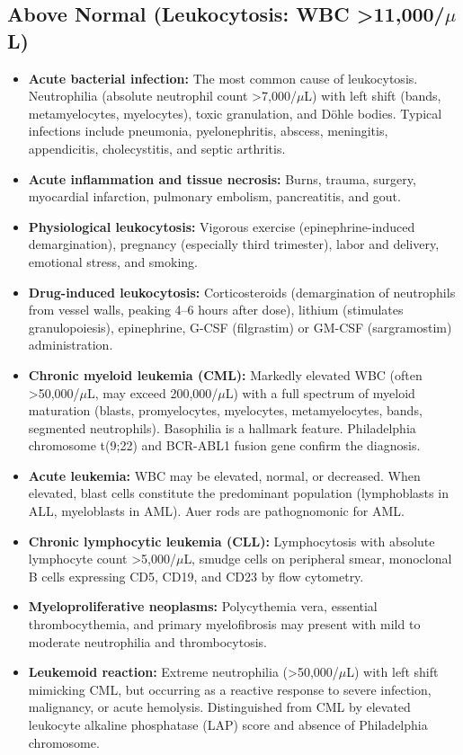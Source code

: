 \subsection*{Above Normal (Leukocytosis: WBC >11,000/$\mu$L)}
\begin{itemize}
  \item \textbf{Acute bacterial infection:} The most common cause of leukocytosis. Neutrophilia (absolute neutrophil count >7,000/$\mu$L) with left shift (bands, metamyelocytes, myelocytes), toxic granulation, and D\"{o}hle bodies. Typical infections include pneumonia, pyelonephritis, abscess, meningitis, appendicitis, cholecystitis, and septic arthritis.
  \item \textbf{Acute inflammation and tissue necrosis:} Burns, trauma, surgery, myocardial infarction, pulmonary embolism, pancreatitis, and gout.
  \item \textbf{Physiological leukocytosis:} Vigorous exercise (epinephrine-induced demargination), pregnancy (especially third trimester), labor and delivery, emotional stress, and smoking.
  \item \textbf{Drug-induced leukocytosis:} Corticosteroids (demargination of neutrophils from vessel walls, peaking 4--6 hours after dose), lithium (stimulates granulopoiesis), epinephrine, G-CSF (filgrastim) or GM-CSF (sargramostim) administration.
  \item \textbf{Chronic myeloid leukemia (CML):} Markedly elevated WBC (often >50,000/$\mu$L, may exceed 200,000/$\mu$L) with a full spectrum of myeloid maturation (blasts, promyelocytes, myelocytes, metamyelocytes, bands, segmented neutrophils). Basophilia is a hallmark feature. Philadelphia chromosome t(9;22) and BCR-ABL1 fusion gene confirm the diagnosis.
  \item \textbf{Acute leukemia:} WBC may be elevated, normal, or decreased. When elevated, blast cells constitute the predominant population (lymphoblasts in ALL, myeloblasts in AML). Auer rods are pathognomonic for AML.
  \item \textbf{Chronic lymphocytic leukemia (CLL):} Lymphocytosis with absolute lymphocyte count >5,000/$\mu$L, smudge cells on peripheral smear, monoclonal B cells expressing CD5, CD19, and CD23 by flow cytometry.
  \item \textbf{Myeloproliferative neoplasms:} Polycythemia vera, essential thrombocythemia, and primary myelofibrosis may present with mild to moderate neutrophilia and thrombocytosis.
  \item \textbf{Leukemoid reaction:} Extreme neutrophilia (>50,000/$\mu$L) with left shift mimicking CML, but occurring as a reactive response to severe infection, malignancy, or acute hemolysis. Distinguished from CML by elevated leukocyte alkaline phosphatase (LAP) score and absence of Philadelphia chromosome.

\end{itemize}
